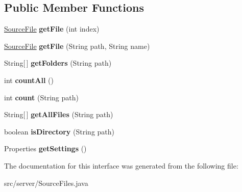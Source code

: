 \subsection*{Public Member Functions}
\begin{DoxyCompactItemize}
\item 
\hypertarget{interfaceserver_1_1_source_files_a2868e156a7aeee67235927b88eb7375b}{
\hyperlink{classvideo_1_1_source_file}{SourceFile} {\bfseries getFile} (int index)}
\label{interfaceserver_1_1_source_files_a2868e156a7aeee67235927b88eb7375b}

\item 
\hypertarget{interfaceserver_1_1_source_files_a757674ac3a55ab7ad833939ac43a5cb7}{
\hyperlink{classvideo_1_1_source_file}{SourceFile} {\bfseries getFile} (String path, String name)}
\label{interfaceserver_1_1_source_files_a757674ac3a55ab7ad833939ac43a5cb7}

\item 
\hypertarget{interfaceserver_1_1_source_files_a4e78c01c79bc46b480fc4b9a80a54171}{
String\mbox{[}$\,$\mbox{]} {\bfseries getFolders} (String path)}
\label{interfaceserver_1_1_source_files_a4e78c01c79bc46b480fc4b9a80a54171}

\item 
\hypertarget{interfaceserver_1_1_source_files_a23d53acce8ce198a9e313db5d7ce2ca1}{
int {\bfseries countAll} ()}
\label{interfaceserver_1_1_source_files_a23d53acce8ce198a9e313db5d7ce2ca1}

\item 
\hypertarget{interfaceserver_1_1_source_files_a9a9f7fae0c299763478e47e2204f1c9d}{
int {\bfseries count} (String path)}
\label{interfaceserver_1_1_source_files_a9a9f7fae0c299763478e47e2204f1c9d}

\item 
\hypertarget{interfaceserver_1_1_source_files_a60b0ee7cc4b0719c7a856c0831764744}{
String\mbox{[}$\,$\mbox{]} {\bfseries getAllFiles} (String path)}
\label{interfaceserver_1_1_source_files_a60b0ee7cc4b0719c7a856c0831764744}

\item 
\hypertarget{interfaceserver_1_1_source_files_ad4c0e61939b92415bcaba0328bbda4aa}{
boolean {\bfseries isDirectory} (String path)}
\label{interfaceserver_1_1_source_files_ad4c0e61939b92415bcaba0328bbda4aa}

\item 
\hypertarget{interfaceserver_1_1_source_files_a5158d0b45daf3baa45054e07dde16d21}{
Properties {\bfseries getSettings} ()}
\label{interfaceserver_1_1_source_files_a5158d0b45daf3baa45054e07dde16d21}

\end{DoxyCompactItemize}


The documentation for this interface was generated from the following file:\begin{DoxyCompactItemize}
\item 
src/server/SourceFiles.java\end{DoxyCompactItemize}
